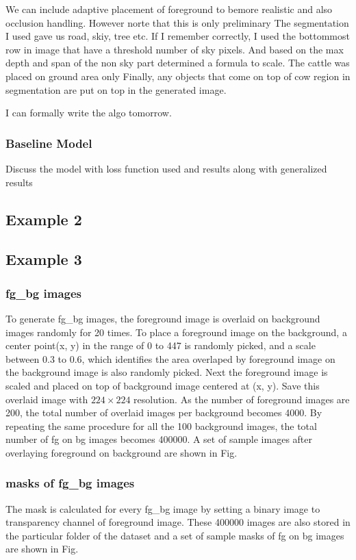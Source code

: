 \documentclass{article}
\begin{document}
We can include adaptive placement of foreground to bemore realistic and also occlusion handling. However norte that this is only preliminary
The segmentation I used gave us road, skiy, tree etc. If I remember correctly, I used the bottommost row in image that have a threshold number of
sky pixels. And based on the max depth and span of the non sky part determined a formula to scale. The cattle was placed on ground area only
Finally, any objects that come on top of cow region in segmentation are put on top in the generated image.

I can formally write the algo tomorrow.

\subsubsection{Baseline Model}
Discuss the model with loss function used and results along with generalized results

\subsection{Example 2} %

\subsection{Example 3} %


\subsubsection{fg\_bg images}
To generate fg\_bg images, the foreground image is overlaid on background images randomly for 20 times. 
To place a foreground image on the background, a center point(x, y) in the range of 0 to 447 is randomly picked,
 and a scale between 0.3 to 0.6, which identifies the area overlaped by foreground image on the background image is also randomly picked. 
 Next the foreground image is scaled and placed on top of background image centered at (x, y). 
 Save this overlaid image with $224 \times 224$ resolution.   
 As the number of foreground images are 200, the total number of overlaid images per background becomes 4000. 
 By repeating the same procedure for all the 100 background images, the total number of fg on bg images becomes 400000. 
 A set of sample images after overlaying foreground on background are shown in Fig. 

\subsubsection{masks of fg\_bg images}
The mask is calculated for every fg\_bg image by setting a binary image to transparency channel of foreground image. 
These 400000 images are also stored in the particular folder of the dataset and a set of sample masks of fg on bg images are shown in Fig.  
\end{document}
